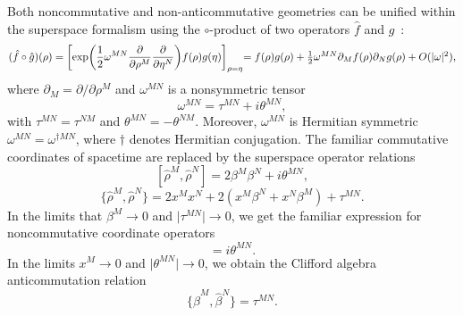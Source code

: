 \documentclass[a4paper,12pt]{article}
\begin{document}
Both noncommutative and
non-anticommutative geometries can be unified within the
superspace formalism using the $\circ$-product of two operators
${\hat f}$ and ${\hat g}$~\cite{Moffat2,Moffat3,Moffat4,Moffat5}:
\begin{equation}
\label{fgproduct}
({\hat f}\circ{\hat g})(\rho)
=\biggl[\exp\biggl(\frac{1}{2}\omega^{MN}
\frac{\partial}{\partial\rho^M}\frac{\partial}{\partial\eta^N}\biggr)
f(\rho)g(\eta)\biggr]_{\rho=\eta} $$ $$
=f(\rho)g(\rho)+\frac{1}{2}\omega^{MN}\partial_M
f(\rho)\partial_Ng(\rho)+O(\vert\omega\vert^2),
\end{equation}
where $\partial_M=\partial/\partial\rho^M$ and $\omega^{MN}$ is a
nonsymmetric tensor
\begin{equation}
\omega^{MN}=\tau^{MN}+i\theta^{MN},
\end{equation} with
$\tau^{MN}=\tau^{NM}$ and $\theta^{MN}=-\theta^{NM}$.
Moreover, $\omega^{MN}$ is Hermitian symmetric
$\omega^{MN}=\omega^{\dagger MN}$, where $\dagger$ denotes Hermitian
conjugation. The familiar commutative coordinates of spacetime are replaced
by the superspace operator relations
\begin{equation}
\label{commutator}
[{\hat\rho}^M,{\hat\rho}^N]=2\beta^M\beta^N+i\theta^{MN},
\end{equation}
\begin{equation}
\label{anticommutator}
\{{\hat\rho}^M,{\hat\rho}^N\}=2x^Mx^N+2(x^M\beta^N+x^N\beta^M)+\tau^{MN}.
\end{equation}
In the limits that $\beta^M\rightarrow 0$ and
$\vert\tau^{MN}\vert\rightarrow 0$, we get the familiar expression for
noncommutative coordinate operators
\begin{equation}
[{\hat x}^M,{\hat x}^N]=i\theta^{MN}.
\end{equation}
In the limits $x^M\rightarrow 0$ and $\vert\theta^{MN}\vert\rightarrow 0$,
we obtain the Clifford algebra anticommutation relation
\begin{equation}
\{{\hat\beta}^M,{\hat\beta}^N\}=\tau^{MN}.
\end{equation}
\end{document}
